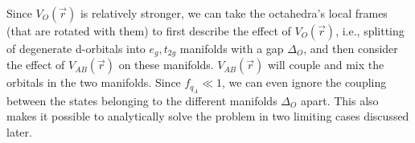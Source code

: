 \documentclass[a4paper,prb]{revtex4-1}  %
\newcommand{\com}[1]{}
\newcommand{\az}[1]{{\color{magenta}{#1}}} %
\begin{document}
Since $V_{O}(\vec r)$ is relatively stronger, 
we can take the octahedra's local frames (that are rotated with them)
to first describe the effect of $V_{O}(\vec r)$, i.e.,
splitting of degenerate d-orbitals into $e_g, t_{2g}$ manifolds with 
a gap $\Delta_O$,
and then
consider the effect of $V_{AB}(\vec r)$ on these manifolds.
$V_{AB}(\vec r)$ will couple and mix the orbitals in the two manifolds.
Since %
$f_{q_A} \ll 1$,
we can even ignore the coupling between the states belonging to the 
different manifolds $\Delta_O$ apart.
This also makes it possible to analytically solve the problem in two limiting cases discussed later.


\com{
The total crystal field potential at the central B atom that we consider
 is given by
\begin{align}
V(\vec r) &= V_O(\vec r) + V_{AB}(\vec r),
\end{align}
where
$V_{AB}(\vec r)=V_{A}(\vec r)+V_{B}(\vec r)$
is due to A and B ion cages.
\az{repetition.... cubic case has similar expressions.... }
}
\end{document}
